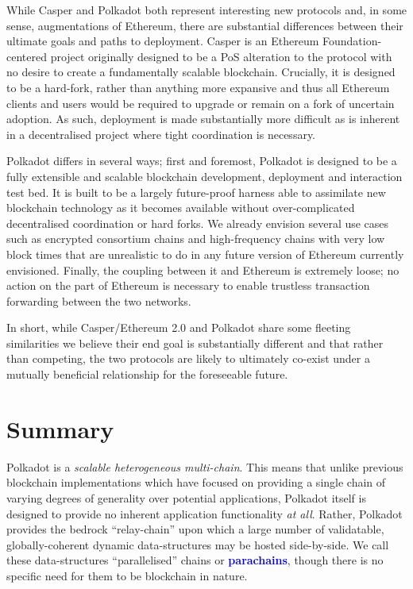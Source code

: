 \documentclass[t,usepdftitle=false]{beamer}
\renewcommand{\textit}[1]{\textcolor{blue}{\textbf{#1}}}
\begin{document}
\begin{frame}
 While Casper and Polkadot both represent interesting new protocols and, in some sense, augmentations of Ethereum, there are substantial differences between their ultimate goals and paths to deployment. Casper is an Ethereum Foundation-centered project originally designed to be a PoS alteration to the protocol with no desire to create a fundamentally scalable blockchain. Crucially, it is designed to be a hard-fork, rather than anything more expansive and thus all Ethereum clients and users would be required to upgrade or remain on a fork of uncertain adoption. As such, deployment is made substantially more difficult as is inherent in a decentralised project where tight coordination is necessary.

 Polkadot differs in several ways; first and foremost, Polkadot is designed to be a fully extensible and scalable blockchain development, deployment and interaction test bed. It is built to be a largely future-proof harness able to assimilate new blockchain technology as it becomes available without over-complicated decentralised coordination or hard forks. We already envision several use cases such as encrypted consortium chains and high-frequency chains with very low block times that are unrealistic to do in any future version of Ethereum currently envisioned. Finally, the coupling between it and Ethereum is extremely loose; no action on the part of Ethereum is necessary to enable trustless transaction forwarding between the two networks.

 In short, while Casper/Ethereum 2.0 and Polkadot share some fleeting similarities we believe their end goal is substantially different and that rather than competing, the two protocols are likely to ultimately co-exist under a mutually beneficial relationship for the foreseeable future.

\section{Summary}\label{summary}

Polkadot is a \emph{scalable heterogeneous multi-chain}. This means that unlike previous blockchain implementations which have focused on providing a single chain of varying degrees of generality over potential applications, Polkadot itself is designed to provide no inherent application functionality \emph{at all}. Rather, Polkadot provides the bedrock ``relay-chain'' upon which a large number of validatable, globally-coherent dynamic data-structures may be hosted side-by-side. We call these data-structures ``parallelised'' chains or \textit{parachains}, though there is no specific need for them to be blockchain in nature.


\end{frame}
\end{document}
